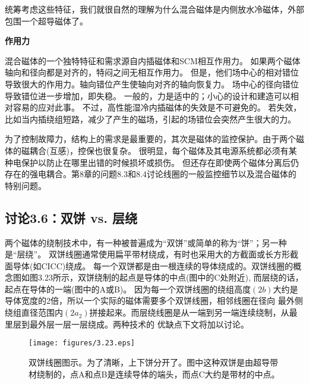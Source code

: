 统筹考虑这些特征，我们就很自然的理解为什么混合磁体是内侧放水冷磁体，外部包围一个超导磁体了。

\textbf{作用力}

混合磁体的一个独特特征和需求源自内插磁体和SCM相互作用力。
如果两个磁体轴向和径向都是对齐的，特闷之间无相互作用力。
但是，他们场中心的相对错位导致很大的作用力。轴向错位产生使轴向对齐的轴向恢复力。
场中心的径向错位导致错位进一步增加，即失稳。
一般的，力是适中的；小心的设计和建造可以相对容易的应对此事。
不过，高性能湿冷内插磁体的失效是不可避免的。
若失效，比如当内插绕组短路，减少了产生的磁场，引起的场错位会突然产生很大的力。

为了控制故障力，结构上的需求是最重要的，其次是磁体的监控保护。由于两个磁体的磁耦合(互感)，控保也很复杂。
很明显，每个磁体及其电源系统都必须有某种电保护以防止在哪里出错的时候损坏或损伤。
但还存在即使两个磁体分离后仍存在的强电耦合。第8章的问题8.3和8.4讨论线圈的一般监控细节以及混合磁体的特别问题。
\newpage

\subsection{讨论3.6：双饼 vs. 层绕}
两个磁体的绕制技术中，有一种被普遍成为“双饼”或简单的称为“饼”；另一种是“层绕”。
双饼线圈通常使用扁平带材绕成，有时也采用大的方截面或长方形截面导体(如CICC)绕成。
每一个双饼都是由一根连续的导体绕成的。双饼线圈的概念图如图3.23所示，双饼绕制的起点是导体的中点(图中的C处附近),
而层绕的话，起点在导体的一端(图中的A或B)。
因为每一个双饼线圈的绕组高度$(2b)$大约是导体宽度的2倍，所以一个实际的磁体需要多个双饼线圈，相邻线圈在径向
最外侧绕组直径范围内$(2a_2)$拼接起来。而层绕线圈是从一端到另一端连续绕制，从最里层到最外层一层一层绕成。两种技术的
优缺点下文将加以讨论。

\begin{figure}[htbp]
	\centering
	\texttt{[image: figures/3.23.eps]}
	\caption{双饼线圈图示。为了清晰，上下饼分开了。图中这种双饼是由超导带材绕制的，点A和点B是连续导体的端头，而点C大约是带材的中点。}
\end{figure}

